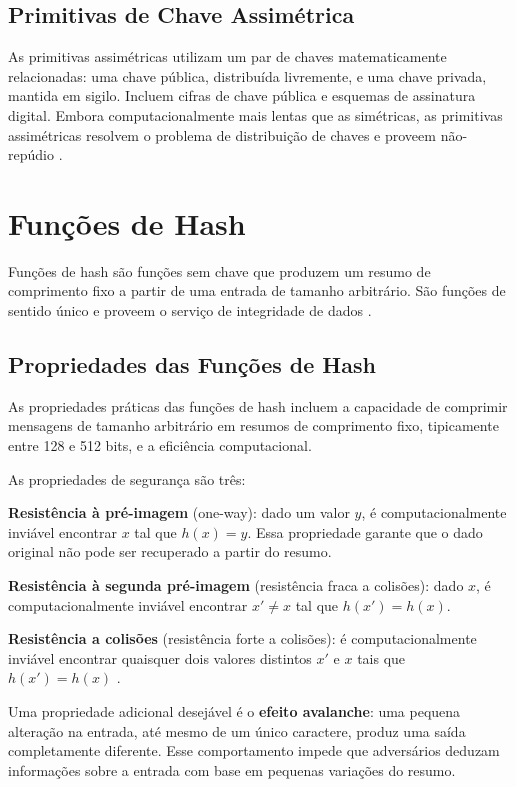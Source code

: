 \documentclass[12pt,a4paper]{report}
\begin{document}
\subsection{Primitivas de Chave Assimétrica}

As primitivas assimétricas utilizam um par de chaves matematicamente relacionadas: uma chave pública, distribuída livremente, e uma chave privada, mantida em sigilo. Incluem cifras de chave pública e esquemas de assinatura digital. Embora computacionalmente mais lentas que as simétricas, as primitivas assimétricas resolvem o problema de distribuição de chaves e proveem não-repúdio \cite{Bashir2023}.

\section{Funções de Hash}

Funções de hash são funções sem chave que produzem um resumo de comprimento fixo a partir de uma entrada de tamanho arbitrário. São funções de sentido único e proveem o serviço de integridade de dados \cite{Bashir2023}.

\subsection{Propriedades das Funções de Hash}

As propriedades práticas das funções de hash incluem a capacidade de comprimir mensagens de tamanho arbitrário em resumos de comprimento fixo, tipicamente entre 128 e 512 bits, e a eficiência computacional.

As propriedades de segurança são três:

\textbf{Resistência à pré-imagem} (one-way): dado um valor $y$, é computacionalmente inviável encontrar $x$ tal que $h(x) = y$. Essa propriedade garante que o dado original não pode ser recuperado a partir do resumo.

\textbf{Resistência à segunda pré-imagem} (resistência fraca a colisões): dado $x$, é computacionalmente inviável encontrar $x' \neq x$ tal que $h(x') = h(x)$.

\textbf{Resistência a colisões} (resistência forte a colisões): é computacionalmente inviável encontrar quaisquer dois valores distintos $x'$ e $x$ tais que $h(x') = h(x)$ \cite{Bashir2023}.

Uma propriedade adicional desejável é o \textbf{efeito avalanche}: uma pequena alteração na entrada, até mesmo de um único caractere, produz uma saída completamente diferente. Esse comportamento impede que adversários deduzam informações sobre a entrada com base em pequenas variações do resumo.
\end{document}
